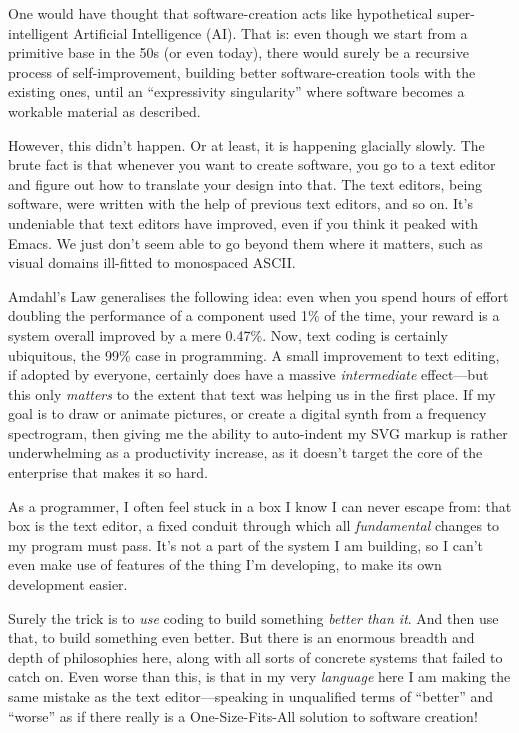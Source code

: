 One would have thought that software-creation acts like hypothetical
super-intelligent Artificial Intelligence (AI). That is: even though we
start from a primitive base in the 50s (or even today), there would
surely be a recursive process of self-improvement, building better
software-creation tools with the existing ones, until an ``expressivity
singularity'' where software becomes a workable material as described.

However, this didn't happen. Or at least, it is happening glacially
slowly. The brute fact is that whenever you want to create software, you
go to a text editor and figure out how to translate your design into
that. The text editors, being software, were written with the help of
previous text editors, and so on. It's undeniable that text editors have
improved, even if you think it peaked with Emacs. We just don't seem
able to go beyond them where it matters, such as visual domains
ill-fitted to monospaced ASCII.

Amdahl's Law generalises the following idea: even when you spend hours
of effort doubling the performance of a component used 1\% of the time,
your reward is a system overall improved by a mere 0.47\%. Now, text
coding is certainly ubiquitous, the 99\% case in programming. A small
improvement to text editing, if adopted by everyone, certainly does have
a massive \emph{intermediate} effect---but this only \emph{matters} to
the extent that text was helping us in the first place. If my goal is to
draw or animate pictures, or create a digital synth from a frequency
spectrogram, then giving me the ability to auto-indent my SVG markup is
rather underwhelming as a productivity increase, as it doesn't target
the core of the enterprise that makes it so hard.

As a programmer, I often feel stuck in a box I know I can never escape
from: that box is the text editor, a fixed conduit through which all
\emph{fundamental} changes to my program must pass. It's not a part of
the system I am building, so I can't even make use of features of the
thing I'm developing, to make its own development easier.

Surely the trick is to \emph{use} coding to build something \emph{better
than it}. And then use that, to build something even better. But there
is an enormous breadth and depth of philosophies here, along with all
sorts of concrete systems that failed to catch on. Even worse than this,
is that in my very \emph{language} here I am making the same mistake as
the text editor---speaking in unqualified terms of ``better'' and
``worse'' as if there really is a One-Size-Fits-All{} solution to
software creation!

